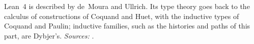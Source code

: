 \begin{literatureconnection}
Lean~4 is described by de~Moura and Ullrich. Its type theory goes back to
the calculus of constructions of Coquand and Huet, with the inductive types
of Coquand and Paulin; inductive families, such as the histories and paths
of this part, are Dybjer's.
\smallskip
\textit{Sources:} \cite{deMouraUllrich2021,CoquandHuet1988,CoquandPaulin1990,Dybjer1994}.
\end{literatureconnection}
